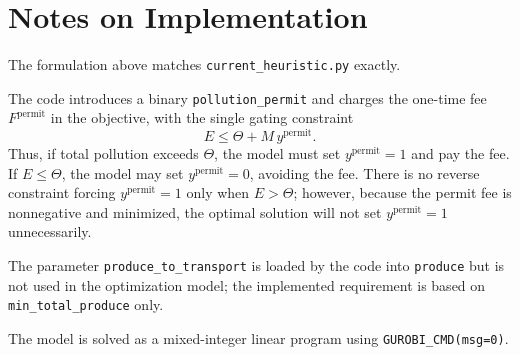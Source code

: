 \section*{Notes on Implementation}

The formulation above matches \texttt{current\_heuristic.py} exactly.

The code introduces a binary \texttt{pollution\_permit} and charges the one-time fee \(F^{\text{permit}}\) in the objective, with the single gating constraint
\[
E \le \Theta + M\, y^{\text{permit}}.
\]
Thus, if total pollution exceeds \(\Theta\), the model must set \(y^{\text{permit}}=1\) and pay the fee. If \(E \le \Theta\), the model may set \(y^{\text{permit}}=0\), avoiding the fee. There is no reverse constraint forcing \(y^{\text{permit}}=1\) only when \(E>\Theta\); however, because the permit fee is nonnegative and minimized, the optimal solution will not set \(y^{\text{permit}}=1\) unnecessarily.

The parameter \texttt{produce\_to\_transport} is loaded by the code into \texttt{produce} but is not used in the optimization model; the implemented requirement is based on \texttt{min\_total\_produce} only.

The model is solved as a mixed-integer linear program using \texttt{GUROBI\_CMD(msg=0)}.
